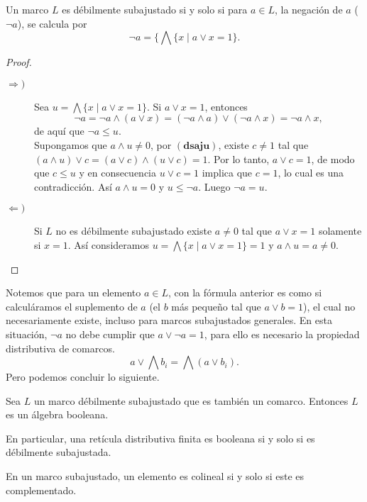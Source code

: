 \begin{thm}\label{Pseudocomplemento}
    Un marco $L$ es débilmente subajustado si y solo si para $a\in L$, la negación de $a$ ($\neg a$), se calcula por 
    \[
    \neg a=\{\bigwedge\{x\mid a\vee x=1\}.
    \]
\end{thm}

\begin{proof}
    \begin{description}
        \item[$\Rightarrow )$] Sea $u=\bigwedge\{x\mid a\vee x=1\}$. Si $a\vee x=1$, entonces 
        \[
        \neg a=\neg a\wedge(a\vee x)=(\neg a\wedge a)\vee (\neg a\wedge x)=\neg a\wedge x,
        \]
        de aquí que $\neg a\leq u$.\\

        \noindent
        Supongamos que $a\wedge u\neq 0$, por $(\mathbf{dsaju})$, existe $c\neq 1$ tal que $(a\wedge u)\vee c=(a\vee c)\wedge (u\vee c)=1$. Por lo tanto, $a\vee c=1$, de modo que $c\leq u$ y en consecuencia $u\vee c=1$ implica que $c=1$, lo cual es una contradicción. Así $a\wedge u=0$ y $u\leq \neg a$. Luego $\neg a=u$.
        \item[$\Leftarrow )$] Si $L$ no es débilmente subajustado existe $a\neq 0$ tal que $a\vee x=1$ solamente si $x=1$. Así consideramos $u=\bigwedge\{x\mid a\vee x=1\}=1$ y $a\wedge u=a\neq 0$. 
    \end{description}
\end{proof}

Notemos que para un elemento $a\in L$, con la fórmula anterior es como si calculáramos el 
suplemento de $a$ (el $b$ más pequeño tal que $a\vee b=1$), el cual no necesariamente existe, 
incluso para marcos subajustados generales. En esta situación, $\neg a$ no debe cumplir que $a\vee \neg a=1$, para ello es necesario la propiedad distributiva de comarcos.
\[
a\vee \bigwedge b_i=\bigwedge (a\vee b_i).
\]
Pero podemos concluir lo siguiente.

\begin{thm}
    Sea $L$ un marco débilmente subajustado que es también un comarco. Entonces $L$ es un álgebra booleana.
\end{thm}

En particular, una retícula distributiva finita es booleana si y solo si es débilmente subajustada.

\begin{prop}
    En un marco subajustado, un elemento es colineal si y solo si este es complementado.
\end{prop}

